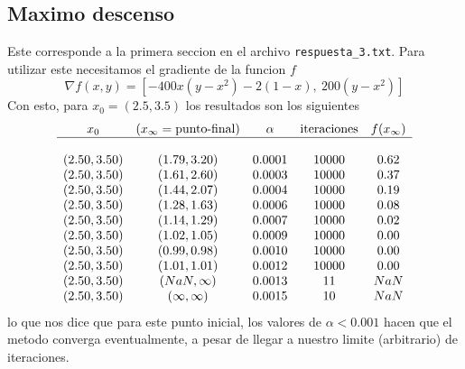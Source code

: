\documentclass[letterpaper]{article}
\begin{document}
\subsection*{Maximo descenso}
Este corresponde a la primera seccion en el archivo
\texttt{respuesta\_3.txt}. Para utilizar este necesitamos el gradiente de
la funcion \(f\)
\[ \nabla f (x,y) = [-400 x (y - x^2) - 2 (1-x),\ 200 (y-x^2)] \]
Con esto, para \(x_0 = (2.5, 3.5)\) los resultados son los siguientes
\[
\begin{array}{c c c c c}
  x_0 & (x_{\infty} = \text{punto-final}) & \alpha & \text{iteraciones} &
    f(x_{\infty}) \\
  \hline \\
  (2.50, 3.50) & (1.79, 3.20)     & 0.0001 & 10000 & 0.62 \\
  (2.50, 3.50) & (1.61, 2.60)     & 0.0003 & 10000 & 0.37 \\
  (2.50, 3.50) & (1.44, 2.07)     & 0.0004 & 10000 & 0.19 \\
  (2.50, 3.50) & (1.28, 1.63)     & 0.0006 & 10000 & 0.08 \\
  (2.50, 3.50) & (1.14, 1.29)     & 0.0007 & 10000 & 0.02 \\
  (2.50, 3.50) & (1.02, 1.05)     & 0.0009 & 10000 & 0.00 \\
  (2.50, 3.50) & (0.99, 0.98)     & 0.0010 & 10000 & 0.00 \\
  (2.50, 3.50) & (1.01, 1.01)     & 0.0012 & 10000 & 0.00 \\
  (2.50, 3.50) & (NaN, \infty)    & 0.0013 & 11    & NaN  \\
  (2.50, 3.50) & (\infty, \infty) & 0.0015 & 10    & NaN  \\
\end{array}
\]
lo que nos dice que para este punto inicial, los valores de \(\alpha <
0.001\) hacen que el metodo converga eventualmente, a pesar de llegar a
nuestro limite (arbitrario) de iteraciones.
\end{document}

